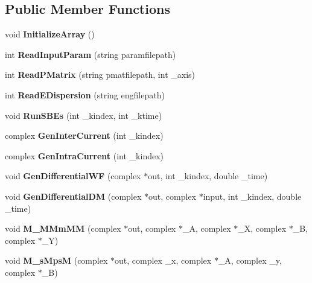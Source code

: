 \subsection*{Public Member Functions}
\begin{DoxyCompactItemize}
\item 
\mbox{\label{classsbes_v_g_ab4630ddde22d61e8d6134f3d15f5c97e}} 
void {\bfseries Initialize\+Array} ()
\item 
\mbox{\label{classsbes_v_g_a94251b18655f69a16511fd6360b0a7d2}} 
int {\bfseries Read\+Input\+Param} (string paramfilepath)
\item 
\mbox{\label{classsbes_v_g_ae70b324fec7546eef19b06fd41f99fd7}} 
int {\bfseries Read\+P\+Matrix} (string pmatfilepath, int \+\_\+axis)
\item 
\mbox{\label{classsbes_v_g_ac552a8a4c736d25b09c76da554867f49}} 
int {\bfseries Read\+E\+Dispersion} (string engfilepath)
\item 
\mbox{\label{classsbes_v_g_a4d0b707ce483f71fbe5641d2b2dd31b3}} 
void {\bfseries Run\+S\+B\+Es} (int \+\_\+kindex, int \+\_\+ktime)
\item 
\mbox{\label{classsbes_v_g_a6bc050a6f8364d46cdfe9bd715fcc82b}} 
complex {\bfseries Gen\+Inter\+Current} (int \+\_\+kindex)
\item 
\mbox{\label{classsbes_v_g_a9c7074989f007f16267d37f834261e91}} 
complex {\bfseries Gen\+Intra\+Current} (int \+\_\+kindex)
\item 
\mbox{\label{classsbes_v_g_acb7e7c231a46abbff1c15f8c5ad7fc42}} 
void {\bfseries Gen\+Differential\+WF} (complex $\ast$out, int \+\_\+kindex, double \+\_\+time)
\item 
\mbox{\label{classsbes_v_g_a2b0b17b2e9090ccbd1ba09dc8aba7061}} 
void {\bfseries Gen\+Differential\+DM} (complex $\ast$out, complex $\ast$input, int \+\_\+kindex, double \+\_\+time)
\item 
\mbox{\label{classsbes_v_g_ab28fafe386e9cee90bdf300fb56a48d3}} 
void {\bfseries M\+\_\+\+M\+Mm\+MM} (complex $\ast$out, complex $\ast$\+\_\+A, complex $\ast$\+\_\+X, complex $\ast$\+\_\+B, complex $\ast$\+\_\+Y)
\item 
\mbox{\label{classsbes_v_g_ad7db4f079b0c17b67085ffef8fd1eac0}} 
void {\bfseries M\+\_\+s\+MpsM} (complex $\ast$out, complex \+\_\+x, complex $\ast$\+\_\+A, complex \+\_\+y, complex $\ast$\+\_\+B)
\end{DoxyCompactItemize}
